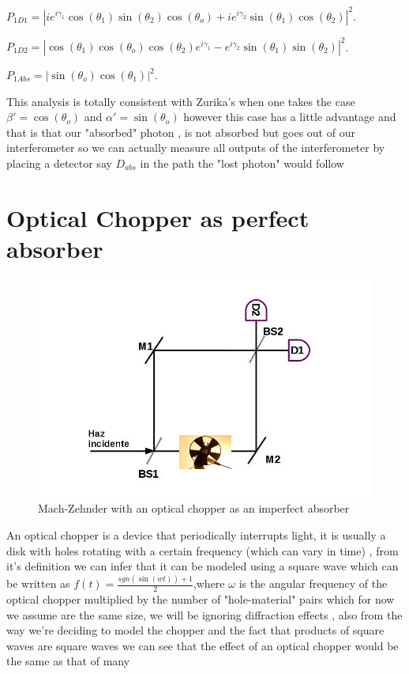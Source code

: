 \documentclass[11pt]{article}
\begin{document}
\vspace{5cm}

$P_{1D1}=|ie^{i\gamma_{1}}\cos(\theta_{1})\sin(\theta_{2})\cos(\theta_{o})+i e^{i\gamma_{2}}\sin(\theta_{1})\cos(\theta_{2})|^2$.

\vspace{0.1cm}

$P_{1D2}=|\cos(\theta_{1})\cos(\theta_{o})\cos(\theta_{2})e^{i\gamma_{1}}-e^{i\gamma_{2}} \sin(\theta_{1})\sin(\theta_{2})|^2$.

\vspace{0.1cm}

$P_{1Abs}=|\sin(\theta_{o}) \cos(\theta_{1})|^2$.

\vspace{0.3cm}

This analysis is totally consistent with Zurika's \cite{tesis de Zurika} when one takes the case $\beta'=\cos(\theta_{o})$ and $\alpha'=\sin(\theta_{o})$ however this case has a little advantage and that is that our "absorbed" photon , is not absorbed but goes out of our interferometer so we can actually measure all outputs of the interferometer by placing a detector say $D_{abs}$ in the path the "lost photon" would follow
 
\section{Optical Chopper as perfect absorber }
 
 \begin{figure}[h!]
\centering
\includegraphics[width=\linewidth]{machzenhderchopper.jpg}
\caption{Mach-Zehnder with an optical chopper as an imperfect absorber}
\label{fig:BS2}
\end{figure}
  An optical chopper is a device that periodically interrupts light, it is usually a disk with holes rotating with a certain frequency (which can vary in time) , from it's definition we can infer that it can be modeled using a square wave which can be written as  $f(t)=\frac{sgn(\sin(wt))+1}{2}$,where $\omega$ is the angular frequency of the optical chopper multiplied by the number of "hole-material" pairs which for now we assume are the same size, we will be ignoring diffraction effects , also from the way we're deciding to model the chopper and the fact that products of square waves are square waves we can see that the effect of an optical chopper would be the same as that of many 
\end{document}
